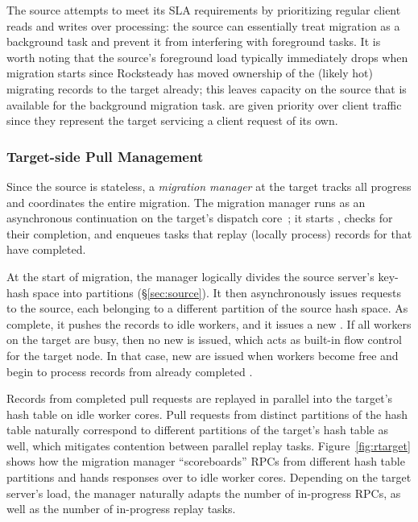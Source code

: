 The source attempts to meet its SLA requirements by prioritizing regular client
reads and writes over \pull processing: the source can essentially treat
migration as a background task and prevent it from interfering with foreground
tasks. It is worth noting that the source's foreground load typically
immediately drops when migration starts since Rocksteady has moved
ownership of the (likely hot) migrating records to the target already; this
leaves capacity on the source that is available for the background migration
task. \priopulls are given priority over client traffic since they
represent the target servicing a client request of its own.


\subsubsection{Target-side Pull Management}

Since the source is stateless, a {\em migration manager} at the target tracks
all progress and coordinates the entire migration.  The migration manager runs
as an asynchronous continuation on the target's dispatch
core~\cite{stutsman:dcft}; it starts \pulls, checks for their
completion, and enqueues tasks that replay (locally process) records for \pulls
that have completed.

At the start of migration, the manager logically divides the source
server's key-hash
space into partitions (\S\ref{sec:source}). It then asynchronously issues
\pull requests to the source, each belonging to a different partition of the
source hash space. As \pulls complete, it pushes the records to idle workers,
and it issues a new \pull. If all workers on the target are busy, then
no new \pull is issued, which acts as built-in flow control
for the target node. In that case, new \pulls are issued when workers become
free and begin to process records from already completed \pulls.

Records from completed pull requests are replayed in parallel into the
target's hash table on idle worker cores.  Pull requests from distinct
partitions of the hash table naturally correspond to different partitions of
the target's hash table as well, which mitigates contention between parallel
replay tasks.
Figure~\ref{fig:rtarget} shows how the
migration manager ``scoreboards'' \pull RPCs from different hash table partitions and
hands responses over to idle worker cores.
Depending on the target server's load, the manager naturally
adapts the number of in-progress \pull RPCs, as well as the number of
in-progress replay tasks.

